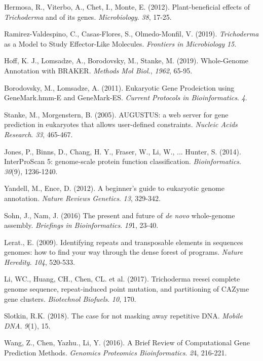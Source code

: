 \documentclass[12pt]{article}
\begin{document}
\begin{thebibliography}{99}
 Hermosa, R., Viterbo, A., Chet, I., Monte,
  E. (2012). Plant-beneficial effects of \textit{Trichoderma} and of
  its genes. \textit{Microbiology}. \textit{38},
  17-25. 

 Ramirez-Valdespino, C., Casas-Flores, S.,
  Olmedo-Monfil, V. (2019). \textit{Trichoderma} as a Model to Study
  Effector-Like Molecules. \textit{Frontiers in Microbiology} \textit{15}.

 Hoff, K. J., Lomsadze, A., Borodovsky, M., 
  Stanke, M. (2019). Whole-Genome Annotation with
  BRAKER. \textit{Methods Mol Biol.}, \textit{1962}, 65-95.

 Borodovsky, M., Lomsadze, A. (2011). Eukaryotic
  Gene Prodeiction using GeneMark.hmm-E and
  GeneMark-ES. \textit{Current Protocols in
    Bioinformatics}. \textit{4}.

 Stanke, M., Morgenstern, B. (2005). AUGUSTUS: a web
  server for gene prediction in eukaryotes that allows user-defined
  constraints. \textit{Nucleic Acids Research}. \textit{33}, 465-467.
  
 Jones, P., Binns, D., Chang, H. Y., Fraser,
  W., Li, W., ... Hunter, S. (2014). InterProScan 5: genome-scale
  protein function
  classification. \textit{Bioinformatics}. \textit{30}(9),
  1236-1240.

 Yandell, M., Ence, D. (2012). A beginner's
  guide to eukaryotic genome annotation. \textit{Nature Reviews
    Genetics}. \textit{13}, 329-342.
  
 Sohn, J., Nam, J. (2016) The present and future of
  \textit{de novo} whole-genome assembly. \textit{Briefings in
    Bioinformatics}. \textit{19}1, 23-40.

 Lerat., E. (2009). Identifying repeats and
  transposable elements in sequences genomes: how to find your way
  through the dense forest of programs. \textit{Nature
    Heredity}. \textit{104}, 520-533.

 Li, WC., Huang, CH., Chen, CL. et
  al. (2017). Trichoderma reesei complete genome sequence,
  repeat-induced point mutation, and partitioning of CAZyme gene
  clusters. \textit{Biotechnol Biofuels}. \textit{10}, 170.

 Slotkin, R.K. (2018). The case for not masking away
  repetitive DNA. \textit{Mobile DNA}. \textit{9}(1), 15.
  
 Wang, Z., Chen, Yazhu., Li, Y. (2016). A Brief
  Review of Computational Gene Prediction Methods. \textit{Genomics
    Proteomics Bioinformatics}. \textit{2}4, 216-221.
  
\end{thebibliography}
\end{document}
